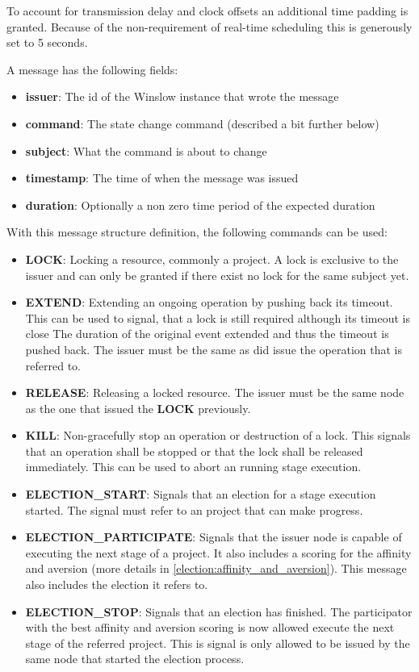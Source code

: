 To account for transmission delay and clock offsets an additional time padding is granted.
Because of the non-requirement of real-time scheduling this is generously set to 5 seconds.

A message has the following fields:

\begin{itemize}
	\item \textbf{issuer}: The id of the Winslow instance that wrote the message
	\item \textbf{command}: The state change command (described a bit further below)
	\item \textbf{subject}: What the command is about to change
	\item \textbf{timestamp}: The time of when the message was issued
	\item \textbf{duration}: Optionally a non zero time period of the expected duration
\end{itemize}

With this message structure definition, the following commands can be used:

\begin{itemize}
	\item \textbf{LOCK}: Locking a resource, commonly a project.
	A lock is exclusive to the issuer and can only be granted if there exist no lock for the same subject yet.
	\item \textbf{EXTEND}: Extending an ongoing operation by pushing back its timeout.
	This can be used to signal, that a lock is still required although its timeout is close
	The duration of the original event extended and thus the timeout is pushed back.
	The issuer must be the same as did issue the operation that is referred to.
	\item \textbf{RELEASE}: Releasing a locked resource.
	The issuer must be the same node as the one that issued the \textbf{LOCK} previously.
	\item \textbf{KILL}: Non-gracefully stop an operation or destruction of a lock.
	This signals that an operation shall be stopped or that the lock shall be released immediately.
	This can be used to abort an running stage execution.
	\item \textbf{ELECTION\_START}: Signals that an election for a stage execution started.
	The signal must refer to an project that can make progress.
	\item \textbf{ELECTION\_PARTICIPATE}: Signals that the issuer node is capable of executing the next stage of a project.
	It also includes a scoring for the affinity and aversion (more details in \autoref{election:affinity_and_aversion}).
	This message also includes the election it refers to.
	\item \textbf{ELECTION\_STOP}: Signals that an election has finished.
	The participator with the best affinity and aversion scoring is now allowed execute the next stage of the referred project.
	This is signal is only allowed to be issued by the same node that started the election process.
\end{itemize}

